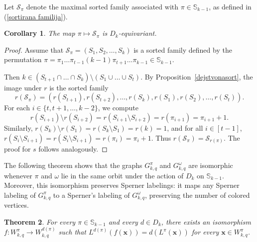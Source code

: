 \documentclass{birkjour}
\newtheorem{thm}{Theorem}[section]
\newtheorem{cor}[thm]{Corollary}
\theoremstyle{definition}
\theoremstyle{remark}
\numberwithin{equation}{section}
\begin{document}
 Let $\mathcal S_\pi$ denote
 the maximal sorted family associated with $\pi\in\mathbb S_{k-1}$,
 as defined in (\ref{sortirana familija}).

\begin{cor}\label{ekvivarijantno}
The map $\pi\mapsto\mathcal S_\pi$ is $D_k$-equivariant.
\end{cor}

\begin{proof} Assume that $\mathcal
S_\pi=(S_1,S_2,\ldots,S_k)$ is a sorted family defined by the
permutation $\pi=\pi_1\ldots\pi_{t-1} (k-1) \pi_{t+1}
\ldots\pi_{k-1}\in\mathbb S_{k-1}$.

Then
 $k\in (S_{t+1}\cap \ldots\cap S_k)\setminus
  (S_1\cup\ldots\cup S_t)$. By Proposition~\ref{dejstvonasort},
  the image under $r$ is the sorted family
\[r(\mathcal S_\pi)=(r(S_{t+1}),r(S_{t+2}),
\ldots,r(S_k),r(S_1),r(S_2),\ldots,r(S_t)).\] For each
$i\in\{t,t+1,\ldots,k-2\}$, we compute
$$r(S_{i+1})\setminus r(S_{i+2})= r(S_{i+1}\setminus
S_{i+2})=r(\pi_{i+1})= \pi_{i+1}+1.$$ Similarly,
 $r(S_k)\setminus r(S_1)=r(S_k\setminus S_1)=r(k)=1$, and for
 all $i\in [t-1]$, $r(S_i\setminus S_{i+1})=r(S_i\setminus S_{i+1})
 =r(\pi_i)=\pi_{i}+1$.
 Thus $r(\mathcal S_\pi)=\mathcal S_{r(\pi)}$.
 The proof for $s$ follows analogously.

\end{proof}

The following theorem shows that the graphs $G_{k,q}^\pi$ and
$G_{k,q}^\omega $
 are isomorphic whenever $\pi$ and $\omega$ lie in the same orbit under
 the action of $D_k$ on $\mathbb S_{k-1}$.
 Moreover, this isomorphism preserves Sperner labelings:
 it maps any Sperner labeling of
 $G_{k,q}^\pi$ to a Sperner's
 labeling of $G_{k,q}^\omega$, preserving the number of colored vertices.

\begin{thm}\label{T:izopriD_k} For every $\pi\in \mathbb{S}_{k-1}$
and every $d\in D_{k}$, there exists an isomorphism
$f:W^\pi_{k,q}\rightarrow W^{d(\pi)}_{k,q}$ such that
$L^{d(\pi)}(f(\mathbf{x}))=d(L^\pi(\mathbf{x}))$ for every
$\mathbf{x}\in W_{k,q}^\pi$.
\end{thm}
\end{document}

